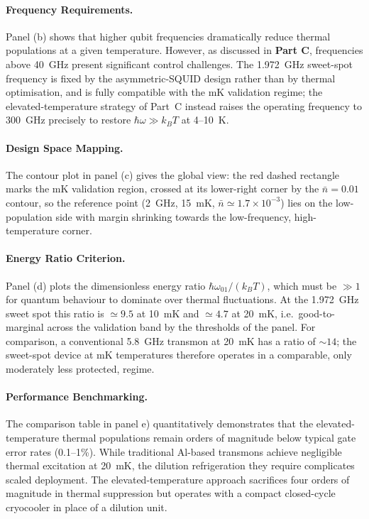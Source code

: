 \paragraph{Frequency Requirements.} Panel (b) shows that higher qubit frequencies dramatically reduce thermal populations at a given temperature. However, as discussed in \textbf{Part C}, frequencies above \SI{40}{GHz} present significant control challenges. The 1.972~GHz sweet-spot frequency is fixed by the asymmetric-SQUID design rather than by thermal optimisation, and is fully compatible with the mK validation regime; the elevated-temperature strategy of Part~C instead raises the operating frequency to 300~GHz precisely to restore $\hbar\omega \gg k_B T$ at 4--10~K.

\paragraph{Design Space Mapping.} The contour plot in panel (c) gives the global view: the red dashed rectangle marks the mK validation region, crossed at its lower-right corner by the $\bar{n}=0.01$ contour, so the reference point (2~GHz, 15~mK, $\bar{n} \simeq 1.7\times10^{-3}$) lies on the low-population side with margin shrinking towards the low-frequency, high-temperature corner.

\paragraph{Energy Ratio Criterion.} Panel (d) plots the dimensionless energy ratio $\hbar\omega_{01}/(k_B T)$, which must be $\gg 1$ for quantum behaviour to dominate over thermal fluctuations. At the 1.972~GHz sweet spot this ratio is $\simeq 9.5$ at \SI{10}{mK} and $\simeq 4.7$ at \SI{20}{mK}, i.e.\ good-to-marginal across the validation band by the thresholds of the panel. For comparison, a conventional 5.8~GHz transmon at \SI{20}{mK} has a ratio of $\sim 14$; the sweet-spot device at mK temperatures therefore operates in a comparable, only moderately less protected, regime.

\paragraph{Performance Benchmarking.} The comparison table in panel e) quantitatively demonstrates that the elevated-temperature thermal populations remain orders of magnitude below typical gate error rates (0.1--1\%). While traditional Al-based transmons achieve negligible thermal excitation at \SI{20}{mK}, the dilution refrigeration they require complicates scaled deployment. The elevated-temperature approach sacrifices four orders of magnitude in thermal suppression but operates with a compact closed-cycle cryocooler in place of a dilution unit.

